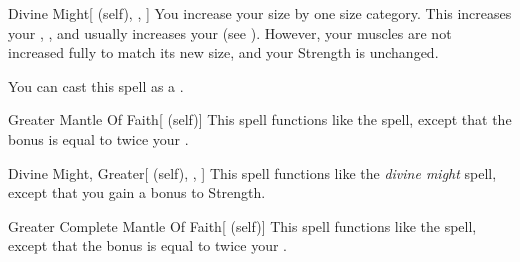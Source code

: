 \lowercase{\hypertarget{spell:Divine Might}{}}\label{spell:Divine Might}
\begin{attuneability}[\nth{3}]{\hypertarget{spell:Divine Might}{Divine Might}}[ (self), , ]
You increase your size by one size category.
This increases your , , and usually increases your  (see ).
However, your muscles are not increased fully to match its new size, and your Strength is unchanged.

You can cast this spell as a .
\end{attuneability}
\vspace{0.25em}



\lowercase{\hypertarget{spell:Greater Mantle Of Faith}{}}\label{spell:Greater Mantle Of Faith}
\begin{attuneability}[\nth{4}]{\hypertarget{spell:Greater Mantle Of Faith}{Greater Mantle Of Faith}}[ (self)]
This spell functions like the  spell, except that the bonus is equal to twice your .
\end{attuneability}
\vspace{0.25em}



\lowercase{\hypertarget{spell:Divine Might, Greater}{}}\label{spell:Divine Might, Greater}
\begin{attuneability}[\nth{5}]{\hypertarget{spell:Divine Might, Greater}{Divine Might, Greater}}[ (self), , ]
This spell functions like the \textit{divine might} spell, except that you gain a  bonus to Strength.
\end{attuneability}
\vspace{0.25em}



\lowercase{\hypertarget{spell:Greater Complete Mantle Of Faith}{}}\label{spell:Greater Complete Mantle Of Faith}
\begin{attuneability}[\nth{5}]{\hypertarget{spell:Greater Complete Mantle Of Faith}{Greater Complete Mantle Of Faith}}[ (self)]
This spell functions like the  spell, except that the bonus is equal to twice your .
\end{attuneability}
\vspace{0.25em}



